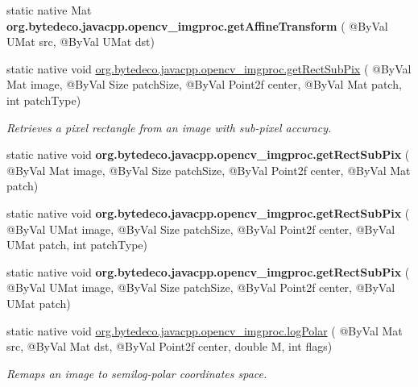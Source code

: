 \begin{DoxyCompactItemize}
static native Mat {\bfseries org.\+bytedeco.\+javacpp.\+opencv\+\_\+imgproc.\+get\+Affine\+Transform} ( @By\+Val U\+Mat src, @By\+Val U\+Mat dst)
\item 
static native void \hyperlink{group__imgproc__transform_gae176a226575415412c0b6ea67126e54e}{org.\+bytedeco.\+javacpp.\+opencv\+\_\+imgproc.\+get\+Rect\+Sub\+Pix} ( @By\+Val Mat image, @By\+Val Size patch\+Size, @By\+Val Point2f center, @By\+Val Mat patch, int patch\+Type)
\begin{DoxyCompactList}\small\item\em Retrieves a pixel rectangle from an image with sub-\/pixel accuracy. \end{DoxyCompactList}\item 
\mbox{\label{group__imgproc__transform_ga3e5ee330e4723639ed6c777fe5e159f2}} 
static native void {\bfseries org.\+bytedeco.\+javacpp.\+opencv\+\_\+imgproc.\+get\+Rect\+Sub\+Pix} ( @By\+Val Mat image, @By\+Val Size patch\+Size, @By\+Val Point2f center, @By\+Val Mat patch)
\item 
\mbox{\label{group__imgproc__transform_ga18f0f876cc01e3fbc483fdabfb3ab4ba}} 
static native void {\bfseries org.\+bytedeco.\+javacpp.\+opencv\+\_\+imgproc.\+get\+Rect\+Sub\+Pix} ( @By\+Val U\+Mat image, @By\+Val Size patch\+Size, @By\+Val Point2f center, @By\+Val U\+Mat patch, int patch\+Type)
\item 
\mbox{\label{group__imgproc__transform_ga877ca823666059b211ff727b90a85290}} 
static native void {\bfseries org.\+bytedeco.\+javacpp.\+opencv\+\_\+imgproc.\+get\+Rect\+Sub\+Pix} ( @By\+Val U\+Mat image, @By\+Val Size patch\+Size, @By\+Val Point2f center, @By\+Val U\+Mat patch)
\item 
static native void \hyperlink{group__imgproc__transform_ga525e11d8b35ba086ca22b5ea9307c6a7}{org.\+bytedeco.\+javacpp.\+opencv\+\_\+imgproc.\+log\+Polar} ( @By\+Val Mat src, @By\+Val Mat dst, @By\+Val Point2f center, double M, int flags)
\begin{DoxyCompactList}\small\item\em Remaps an image to semilog-\/polar coordinates space. \end{DoxyCompactList}\item 
\mbox{\label{group__imgproc__transform_ga4d25419504c465efa8ec059ffa4b71ba}} 

\end{DoxyCompactItemize}
